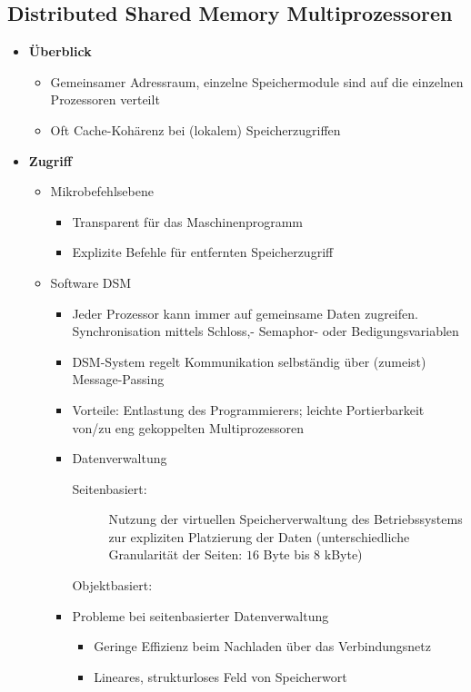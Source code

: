 \subsection{Distributed Shared Memory Multiprozessoren}
\begin{itemize}
	\item \textbf{Überblick}
	\begin{itemize}
		\item Gemeinsamer Adressraum, einzelne Speichermodule sind auf die einzelnen Prozessoren verteilt
		\item Oft Cache-Kohärenz bei (lokalem) Speicherzugriffen
	\end{itemize}
	\item \textbf{Zugriff}
	\begin{itemize}
		\item Mikrobefehlsebene
		\begin{itemize}
			\item Transparent für das Maschinenprogramm
			\item Explizite Befehle für entfernten Speicherzugriff
		\end{itemize}
		\item Software DSM
		\begin{itemize}
			\item Jeder Prozessor kann immer auf gemeinsame Daten zugreifen. Synchronisation mittels Schloss,- Semaphor- oder Bedigungsvariablen
			\item DSM-System regelt Kommunikation selbständig über (zumeist) Message-Passing
			\item Vorteile: Entlastung des Programmierers; leichte Portierbarkeit von/zu eng gekoppelten Multiprozessoren
			\item Datenverwaltung
			\begin{description}
				\item[Seitenbasiert:] Nutzung der virtuellen Speicherverwaltung des Betriebssystems zur expliziten Platzierung der Daten (unterschiedliche Granularität der Seiten: \(16\) Byte bis \(8\) kByte)
				\item[Objektbasiert:] %
			\end{description}
			\item Probleme bei seitenbasierter Datenverwaltung
			\begin{itemize}
				\item Geringe Effizienz beim Nachladen über das Verbindungsnetz
				\item Lineares, strukturloses Feld von Speicherwort

\end{itemize}
\end{itemize}
\end{itemize}
\end{itemize}
